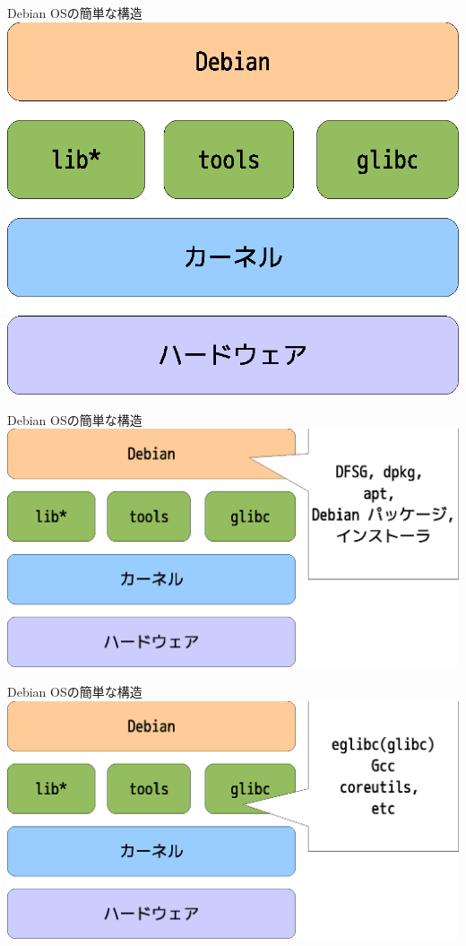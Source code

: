 \begin{frame}{Debian OSの簡単な構造}
\includegraphics[width=0.7\hsize]{image201006/os-block01.eps}
\end{frame}


\begin{frame}{Debian OSの簡単な構造}
\includegraphics[width=1.0\hsize]{image201006/os-block01-1.eps}
\end{frame}


\begin{frame}{Debian OSの簡単な構造}
\includegraphics[width=1.0\hsize]{image201006/os-block01-2.eps}
\end{frame}



